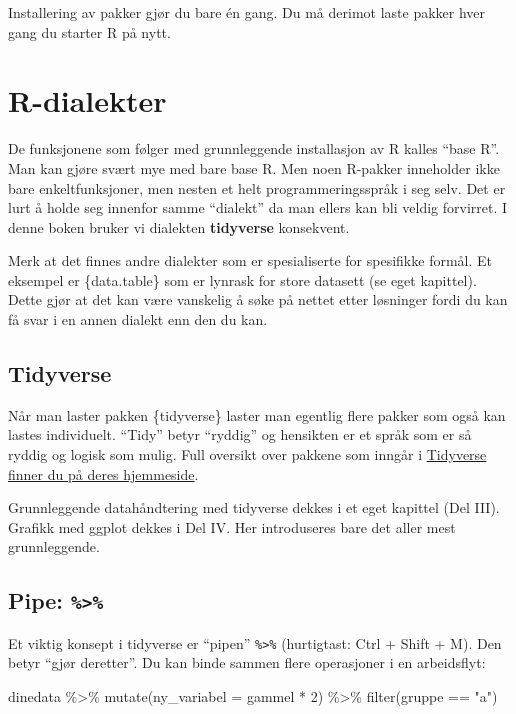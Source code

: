 \documentclass[
  norsk,
  letterpaper,
  DIV=11,
  numbers=noendperiod]{scrreprt}
\newenvironment{Shaded}{\begin{snugshade}}{\end{snugshade}}
\newcommand{\AttributeTok}[1]{\textcolor[rgb]{0.40,0.45,0.13}{#1}}
\newcommand{\DecValTok}[1]{\textcolor[rgb]{0.68,0.00,0.00}{#1}}
\newcommand{\FunctionTok}[1]{\textcolor[rgb]{0.28,0.35,0.67}{#1}}
\newcommand{\NormalTok}[1]{\textcolor[rgb]{0.00,0.23,0.31}{#1}}
\newcommand{\SpecialCharTok}[1]{\textcolor[rgb]{0.37,0.37,0.37}{#1}}
\newcommand{\StringTok}[1]{\textcolor[rgb]{0.13,0.47,0.30}{#1}}
\theoremstyle{definition}
\theoremstyle{remark}
\begin{document}
Installering av pakker gjør du bare én gang. Du må derimot laste pakker
hver gang du starter R på nytt.

\section{R-dialekter}\label{r-dialekter}

De funksjonene som følger med grunnleggende installasjon av R kalles
``base R''. Man kan gjøre svært mye med bare base R. Men noen R-pakker
inneholder ikke bare enkeltfunksjoner, men nesten et helt
programmeringsspråk i seg selv. Det er lurt å holde seg innenfor samme
``dialekt'' da man ellers kan bli veldig forvirret. I denne boken bruker
vi dialekten \textbf{tidyverse} konsekvent.

Merk at det finnes andre dialekter som er spesialiserte for spesifikke
formål. Et eksempel er \{data.table\} som er lynrask for store datasett
(se eget kapittel). Dette gjør at det kan være vanskelig å søke på
nettet etter løsninger fordi du kan få svar i en annen dialekt enn den
du kan.

\subsection{Tidyverse}\label{tidyverse}

Når man laster pakken \{tidyverse\} laster man egentlig flere pakker som
også kan lastes individuelt. ``Tidy'' betyr ``ryddig'' og hensikten er
et språk som er så ryddig og logisk som mulig. Full oversikt over
pakkene som inngår i \href{https://www.tidyverse.org/}{Tidyverse finner
du på deres hjemmeside}.

Grunnleggende datahåndtering med tidyverse dekkes i et eget kapittel
(Del III). Grafikk med ggplot dekkes i Del IV. Her introduseres bare det
aller mest grunnleggende.

\subsection{\texorpdfstring{Pipe:
\texttt{\%\textgreater{}\%}}{Pipe: \%\textgreater\%}}\label{pipe}

Et viktig konsept i tidyverse er ``pipen'' \texttt{\%\textgreater{}\%}
(hurtigtast: Ctrl + Shift + M). Den betyr ``gjør deretter''. Du kan
binde sammen flere operasjoner i en arbeidsflyt:

\begin{Shaded}
\begin{Highlighting}[]
\NormalTok{dinedata }\SpecialCharTok{\%\textgreater{}\%}
  \FunctionTok{mutate}\NormalTok{(}\AttributeTok{ny\_variabel =}\NormalTok{ gammel }\SpecialCharTok{*} \DecValTok{2}\NormalTok{) }\SpecialCharTok{\%\textgreater{}\%}
  \FunctionTok{filter}\NormalTok{(gruppe }\SpecialCharTok{==} \StringTok{"a"}\NormalTok{)}
\end{Highlighting}
\end{Shaded}
\end{document}
